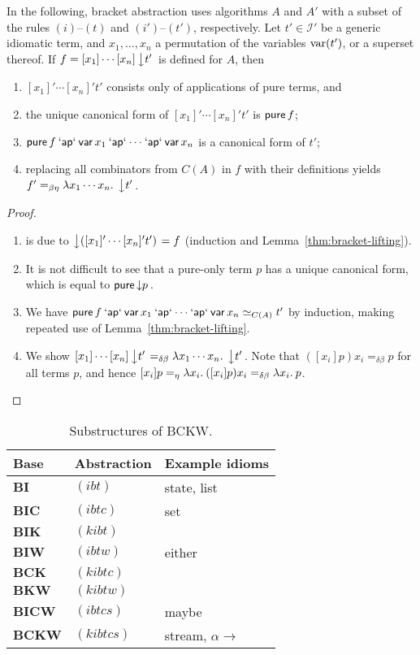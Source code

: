 \begin{theorem}\label{thm:unlifting}
In the following, bracket abstraction uses algorithms $A$ and $A'$ with
a subset of the rules $(i)$--$(t)$ and $(i')$--$(t')$, respectively.
Let $t' \in \mathcal{I}'$ be a generic idiomatic term, and $x_1,\dots,x_n$
a permutation of the variables $\operatorname{var}(t')$, or a superset thereof.
If $f = [x_1]\cdots[x_n]\left\downarrow t'\right.$ is defined for $A$, then
\begin{enumerate}
\item $[x_1]'\cdots[x_n]'t'$ consists only of applications of pure terms, and
\item the unique canonical form of $[x_1]'\cdots[x_n]'t'$ is $\operatorname{\mathsf{pure}} f$;
\item $\operatorname{\mathsf{pure}} f \mathbin{\mathsf{`ap`}} \operatorname{\mathsf{var}} x_1 \mathbin{\mathsf{`ap`}} \cdots \mathbin{\mathsf{`ap`}} \operatorname{\mathsf{var}} x_n$ is a canonical
	form of $t'$;
\item replacing all combinators from $C(A)$ in $f$ with their definitions
	yields $f' =_{\beta\eta} \lambda x_1\cdots x_n.\>\left\downarrow t'\right.$.
\end{enumerate}
\end{theorem}
\begin{proof}
\begin{enumerate}
\item is due to $\left\downarrow ([x_1]'\cdots[x_n]'t')\right. = f$ (induction and
	Lemma~\ref{thm:bracket-lifting}).
\item It is not difficult to see that a pure-only term $p$ has a unique canonical
	form, which is equal to $\operatorname{\mathsf{pure}} \left\downarrow p\right.$.
\item We have $\operatorname{\mathsf{pure}} f \mathbin{\mathsf{`ap`}} \operatorname{\mathsf{var}} x_1 \mathbin{\mathsf{`ap`}} \cdots \mathbin{\mathsf{`ap`}} \operatorname{\mathsf{var}} x_n \simeq_{C(A)} t'$
	by induction, making repeated use of Lemma~\ref{thm:bracket-lifting}.
\item We show $[x_1]\cdots[x_n]\left\downarrow t'\right. =_{\delta\beta} \lambda x_1\cdots x_n.\>\left\downarrow t'\right.$.
	Note that $([x_i]p)x_i =_{\delta\beta} p$ for all terms $p$, and hence
	$[x_i]p =_\eta \lambda x_i.\>([x_i]p)x_i =_{\delta\beta} \lambda x_i.\>p$.
\end{enumerate}
\end{proof}

\begin{table}\centering
\begin{tabular}{lll} Base & Abstraction & Example idioms \\
\hline
$\mathbf{BI}$ & $(ibt)$ & state, list \\
$\mathbf{BIC}$ & $(ibtc)$ & set \\
$\mathbf{BIK}$ & $(kibt)$ & \\
$\mathbf{BIW}$ & $(ibtw)$ & either \\
$\mathbf{BCK}$ & $(kibtc)$ & \\
$\mathbf{BKW}$ & $(kibtw)$ & \\
$\mathbf{BICW}$ & $(ibtcs)$ & maybe \\
$\mathbf{BCKW}$ & $(kibtcs)$ & stream, $\alpha \to$ \\
\end{tabular}
\caption{Substructures of BCKW.}
\label{tab:combinator-bases}
\end{table}

